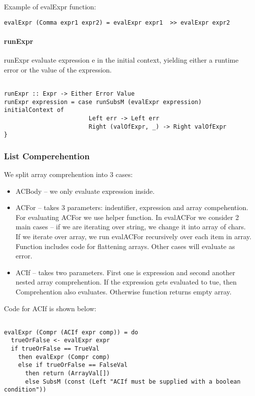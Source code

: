 \documentclass[11pt]{article}
\begin{document}
Example of evalExpr function:

\begin{verbatim}
evalExpr (Comma expr1 expr2) = evalExpr expr1  >> evalExpr expr2

\end{verbatim}

\paragraph{runExpr}
runExpr evaluate expression e in the initial context, yielding either a runtime error or the value of the expression.
\begin{verbatim}

runExpr :: Expr -> Either Error Value
runExpr expression = case runSubsM (evalExpr expression) initialContext of
  						Left err -> Left err
  						Right (valOfExpr, _) -> Right valOfExpr
}
\end{verbatim}

\subsubsection{List Comperehention}

We split array comprehention into 3 cases: 
\begin{itemize}
\item ACBody -- we only evaluate expression inside.
\item ACFor -- takes 3 parameters: indentifier, expression and array compehention. For evaluating ACFor we use helper function. In evalACFor we consider 2 main cases -- if we are iterating over string, we change it into array of chars. If we iterate over array, we run evalACFor recursively over each item in array. Function includes code for flattening arrays. Other cases will evaluate as error. 
\item ACIf -- takes two parameters. First one is expression and second another nested array comprehention. If the expression gets evaluated to tue, then Comprehention also evaluates. Otherwise function returns empty array.

\end{itemize}
Code for ACIf is shown below:
\begin{verbatim}

evalExpr (Compr (ACIf expr comp)) = do
  trueOrFalse <- evalExpr expr
  if trueOrFalse == TrueVal
    then evalExpr (Compr comp)
    else if trueOrFalse == FalseVal
      then return (ArrayVal[])
      else SubsM (const (Left "ACIf must be supplied with a boolean condition"))
\end{verbatim} 
\end{document}
